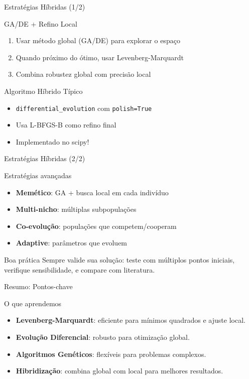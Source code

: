 \begin{frame}{Estratégias Híbridas (1/2)}
\begin{block}{GA/DE + Refino Local}
\begin{enumerate}
    \item Usar método global (GA/DE) para explorar o espaço
    \item Quando próximo do ótimo, usar Levenberg-Marquardt
    \item Combina robustez global com precisão local
\end{enumerate}
\end{block}

\begin{block}{Algoritmo Híbrido Típico}
\begin{itemize}
    \item \texttt{differential\_evolution} com \texttt{polish=True}
    \item Usa L-BFGS-B como refino final
    \item Implementado no scipy!
\end{itemize}
\end{block}
\end{frame}

\begin{frame}{Estratégias Híbridas (2/2)}
\begin{block}{Estratégias avançadas}
\begin{itemize}
    \item \textbf{Memético}: GA + busca local em cada indivíduo
    \item \textbf{Multi-nicho}: múltiplas subpopulações
    \item \textbf{Co-evolução}: populações que competem/cooperam
    \item \textbf{Adaptive}: parâmetros que evoluem
\end{itemize}
\end{block}

\begin{alertblock}{Boa prática}
Sempre valide sua solução: teste com múltiplos pontos iniciais, verifique sensibilidade, e compare com literatura.
\end{alertblock}
\end{frame}

\begin{frame}{Resumo: Pontos-chave}
\begin{block}{O que aprendemos}
\begin{itemize}
    \item \textbf{Levenberg-Marquardt}: eficiente para mínimos quadrados e ajuste local.
    \item \textbf{Evolução Diferencial}: robusto para otimização global.
    \item \textbf{Algoritmos Genéticos}: flexíveis para problemas complexos.
    \item \textbf{Hibridização}: combina global com local para melhores resultados.
\end{itemize}
\end{block}
\end{frame}

